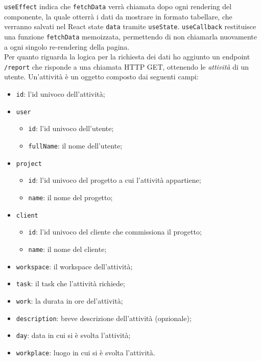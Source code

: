 \noindent \texttt{useEffect} indica che \texttt{fetchData} verrà chiamata dopo ogni rendering del componente, la quale otterrà i dati da mostrare in formato tabellare, che verranno salvati nel React state \texttt{data} tramite \texttt{useState}.
\texttt{useCallback} restituisce una funzione \texttt{fetchData} memoizzata, permettendo di non chiamarla nuovamente a ogni singolo re-rendering della pagina.\\
Per quanto riguarda la logica per la richiesta dei dati ho aggiunto un endpoint \texttt{/report} che risponde a una chiamata HTTP GET, ottenendo le \textit{attività} di un utente. Un'attività è un oggetto composto dai seguenti campi:
\begin{itemize}
  \item \texttt{id}: l'id univoco dell'attività;
  \item \texttt{user}
  \begin{itemize}
    \item \texttt{id}: l'id univoco dell'utente;
    \item \texttt{fullName}: il nome dell'utente;  
  \end{itemize}
  \item \texttt{project}
  \begin{itemize}
    \item \texttt{id}: l'id univoco del progetto a cui l'attività appartiene;
    \item \texttt{name}: il nome del progetto;
  \end{itemize}
  \item \texttt{client}
  \begin{itemize}
    \item \texttt{id}: l'id univoco del cliente che commissiona il progetto;
    \item \texttt{name}: il nome del cliente;
  \end{itemize}
  \item \texttt{workspace}: il workspace dell'attività;
  \item \texttt{task}: il task che l'attività richiede;
  \item \texttt{work}: la durata in ore del'attività;
  \item \texttt{description}: breve descrizione dell'attività (opzionale);
  \item \texttt{day}: data in cui si è svolta l'attività;
  \item \texttt{workplace}: luogo in cui si è svolta l'attività.
\end{itemize}

